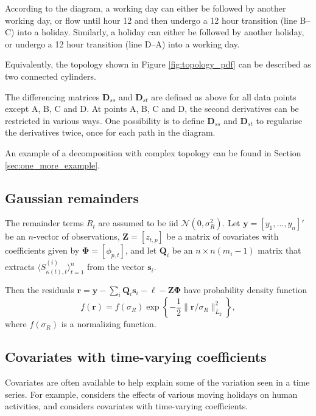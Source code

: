 \documentclass[ijds,nonblindrev]{informs-ijds}
\begin{document}
According to the diagram, a working day can either be followed by another working day, or flow until hour 12 and then undergo a 12 hour transition (line B--C) into a holiday. Similarly, a holiday can either be followed by another holiday, or undergo a 12 hour transition (line D--A) into a working day.

Equivalently, the topology shown in Figure \ref{fig:topology_pdf} can be described as two connected cylinders.

The differencing matrices \(\bm{D}_{ss}\) and \(\bm{D}_{st}\) are defined as above for all data points except A, B, C and D. At points A, B, C and D, the second derivatives can be restricted in various ways. One possibility is to define \(\bm{D}_{ss}\) and \(\bm{D}_{st}\) to regularise the derivatives twice, once for each path in the diagram.

An example of a decomposition with complex topology can be found in Section \ref{sec:one_more_example}.

\hypertarget{gaussian-remainders}{%
\subsection{Gaussian remainders}\label{gaussian-remainders}}

The remainder terms \(R_{t}\) are assumed to be iid \(\mathcal{N}(0,\sigma_R^2)\).
Let \(\bm{y} = [y_1,\dots,y_n]'\) be an \(n\)-vector of observations, \(\bm{Z}=[z_{t,p}]\) be a matrix of covariates with coefficients given by \(\bm{\Phi} = [\phi_{p,t}]\), and let \(\bm{Q}_i\) be an \(n \times n(m_i-1)\) matrix that extracts \(\langle S^{(i)}_{\kappa(t),t} \rangle_{t=1}^{n}\) from the vector \(\bm{s}_i\).

Then the residuals \(\bm{r} = \bm{y} - \sum_i\bm{Q}_i\bm{s}_i -\bm{\ell} - \bm{Z}\bm{\Phi}\) have probability density function
\[
  f(\bm{r}) = f(\sigma_R)\exp\left\{-\frac{1}{2}\big\|\bm{r}/\sigma_R\big\|_{L_2}^2\right\},
\]
where \(f(\sigma_R)\) is a normalizing function.

\hypertarget{covariates-with-time-varying-coefficients}{%
\subsection{Covariates with time-varying coefficients}\label{covariates-with-time-varying-coefficients}}

Covariates are often available to help explain some of the variation seen in a time series. For example, \citet{findley2009stock} considers the effects of various moving holidays on human activities, and \citet{bell2004modeling} considers covariates with time-varying coefficients.
\end{document}
